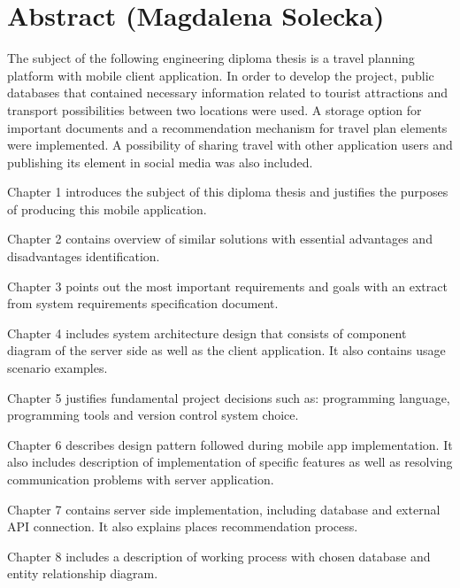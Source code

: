 \chapter*{Abstract (Magdalena Solecka)}
\par The subject of the following engineering diploma thesis is a travel planning 
platform with mobile client application. In order to develop the project, public 
databases that contained necessary information related to tourist attractions and 
transport possibilities between two locations were used. A storage option for important 
documents and a recommendation mechanism for travel plan elements were implemented. 
A possibility of sharing travel with other application users and publishing its element 
in social media was also included.
 
\par Chapter 1 introduces the subject of this diploma thesis and justifies the purposes 
of producing this mobile application. 
 
\par Chapter 2 contains overview of similar solutions with essential advantages and 
disadvantages identification.

\par Chapter 3 points out the most important requirements and goals with an extract from 
system requirements specification document.

\par Chapter 4 includes system architecture design that consists of component diagram of 
the server side as well as the client application. It also contains usage scenario 
examples.

\par Chapter 5 justifies fundamental project decisions such as: programming language, 
programming tools and version control system choice.

\par Chapter 6 describes design pattern followed during mobile app implementation. It 
also includes description of implementation of specific features as well as resolving 
communication problems with server application.

\par Chapter 7 contains server side implementation, including database and external API connection.
It also explains places recommendation process. 

\par Chapter 8 includes a description of working process with chosen database and entity 
relationship diagram.

